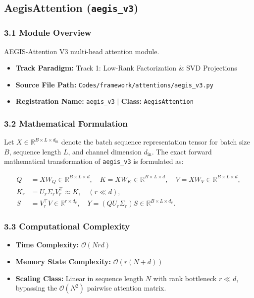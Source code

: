 \subsection{AegisAttention (\texttt{aegis\_v3})}
\label{sec:app_module_aegis_v3}

\subsubsection*{3.1 Module Overview}
AEGIS-Attention V3 multi-head attention module.
\begin{itemize}
    \item \textbf{Track Paradigm:} Track 1: Low-Rank Factorization \& SVD Projections
    \item \textbf{Source File Path:} \texttt{Codes/framework/attentions/aegis\_v3.py}
    \item \textbf{Registration Name:} \texttt{aegis\_v3} $\mid$ \textbf{Class:} \texttt{AegisAttention}
\end{itemize}

\subsubsection*{3.2 Mathematical Formulation}
Let $X \in \mathbb{R}^{B \times L \times d_{\text{in}}}$ denote the batch sequence representation tensor for batch size $B$, sequence length $L$, and channel dimension $d_{\text{in}}$. The exact forward mathematical transformation of \texttt{aegis\_v3} is formulated as:

\begin{align}
Q &= X W_Q \in \mathbb{R}^{B \times L \times d}, \quad K = X W_K \in \mathbb{R}^{B \times L \times d}, \quad V = X W_V \in \mathbb{R}^{B \times L \times d}, \\
K_r &= U_r \Sigma_r V_r^\top \approx K, \quad (r \ll d), \\
S &= V_r^\top V \in \mathbb{R}^{r \times d_v}, \quad Y = (Q U_r \Sigma_r) S \in \mathbb{R}^{B \times L \times d_v}.
\end{align}


\subsubsection*{3.3 Computational Complexity}
\begin{itemize}
    \item \textbf{Time Complexity:} $\mathcal{O}(N r d)$
    \item \textbf{Memory State Complexity:} $\mathcal{O}(r(N + d))$
    \item \textbf{Scaling Class:} Linear in sequence length $N$ with rank bottleneck $r \ll d$, bypassing the $\mathcal{O}(N^2)$ pairwise attention matrix.
\end{itemize}

